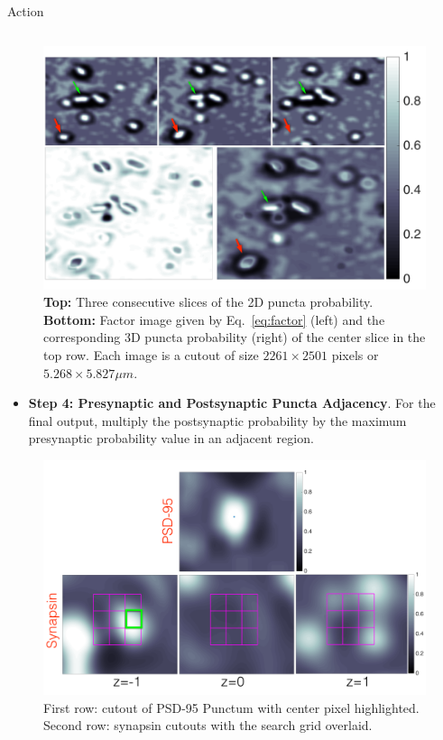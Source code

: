 \documentclass[final, table]{beamer}
\newlength{\onecolwid}
\newlength{\twocolwid}
\begin{document}
\begin{frame}[t]
\begin{columns}[t]
\begin{column}{\twocolwid}
\begin{block}{Action}
\begin{columns}[t]
\begin{column}{\onecolwid}
\begin{figure}
\includegraphics[width=1\textwidth]{figs/factor_result}
\caption{\textbf{Top:} Three consecutive slices of the 2D puncta probability. \textbf{Bottom:} Factor image given by Eq.~\eqref{eq:factor} (left) and the corresponding 3D puncta probability (right) of the center slice in the top row. Each image is a cutout of size $2261 \times 2501$ pixels or $5.268 \times 5.827 \mu m$.}
\label{fig:factor_result}
\end{figure}


\begin{itemize} 
\item \textbf{Step 4: Presynaptic and Postsynaptic Puncta Adjacency}.  For the final output, multiply the postsynaptic probability by the maximum presynaptic probability value in an adjacent region. 
\end{itemize} 

\begin{figure}[!h]
\centering
\includegraphics[width=1\textwidth]{figs/gridsearch}
\caption{First row: cutout of PSD-95 Punctum with center pixel highlighted. Second row: synapsin cutouts with the search grid overlaid.} 
\end{figure} 



\end{column}
\end{columns}
\end{block}
\end{column}
\end{columns}
\end{frame}
\end{document}
